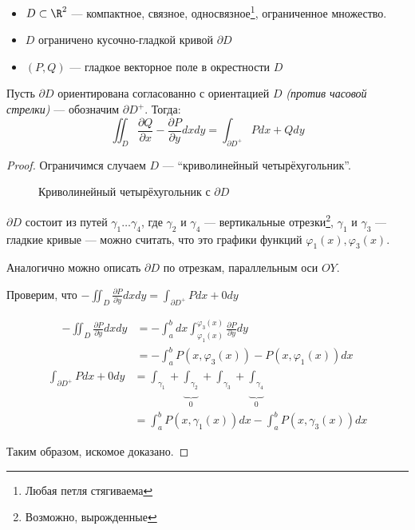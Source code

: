 \begin{theorem}\itemfix
    \begin{itemize}
        \item \(D\subset \R^2\) --- компактное, связное, односвязное\footnote{Любая петля стягиваема}, ограниченное множество.
        \item \(D\) ограничено кусочно-гладкой кривой \(\partial D\)
        \item \((P, Q)\) --- гладкое векторное поле в окрестности \(D\)
    \end{itemize}

    Пусть \(\partial D\) ориентирована согласованно с ориентацией \(D\) \textit{(против часовой стрелки)} --- обозначим \(\partial D^{ +}\). Тогда:
    \[\iint_D \frac{\partial Q}{\partial x} - \frac{\partial P}{\partial y} dx dy = \int_{\partial D^{ +}} Pdx + Qdy\]
\end{theorem}
\begin{proof}
    Ограничимся случаем \(D\) --- ``криволинейный четырёхугольник''.

    \begin{figure}[h]
        
        \centering
        \caption{Криволинейный четырёхугольник с \(\partial D\)}
    \end{figure}

    \(\partial D\) состоит из путей \(\gamma_1 \dots \gamma_4\), где \(\gamma_2\) и \(\gamma_4\) --- вертикальные отрезки\footnote{Возможно, вырожденные}, \(\gamma_1\) и \(\gamma_3\) --- гладкие кривые --- можно считать, что это графики функций \(\varphi_1(x), \varphi_3(x)\).

    Аналогично можно описать \(\partial D\) по отрезкам, параллельным оси \(OY\). %

    Проверим, что \( - \iint_D \frac{\partial P}{\partial y} dx dy = \int_{\partial D^{ +}} Pdx + 0 dy\)

    \begin{align*}
        - \iint_D \frac{\partial P}{\partial y} dx dy & = -\int_a^b dx \int_{\varphi_1(x)}^{\varphi_3(x)} \frac{\partial P}{\partial y} dy \\
                                                      & = -\int_a^b P(x, \varphi_3(x)) - P(x, \varphi_1(x)) dx
    \end{align*}
    \begin{align*}
        \int_{\partial D^{ +}} Pdx + 0 dy & = \int_{\gamma_1} + \underbrace{\int_{\gamma_2}}_0 + \int_{\gamma_3} + \underbrace{\int_{\gamma_4}}_0 \\
                                          & = \int_a^b P(x, \gamma_1(x)) dx - \int_a^b P(x, \gamma_3(x)) dx
    \end{align*}

    Таким образом, искомое доказано.
\end{proof}

